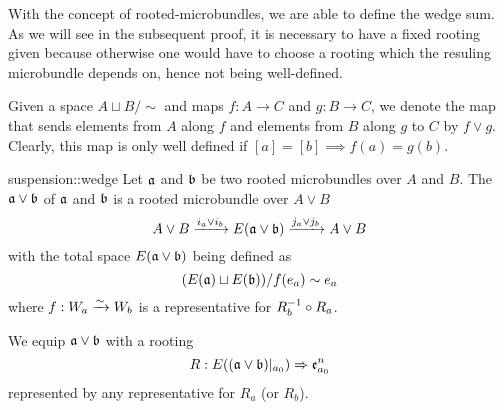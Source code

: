 \begin{myparagraph}
    With the concept of rooted-microbundles,
    we are able to define the wedge sum.
    As we will see in the subsequent proof,
    it is necessary to have a fixed rooting given because otherwise
    one would have to choose a rooting which the resuling microbundle depends on,
    hence not being well-defined.

    Given a space $A \sqcup B / \sim$ and maps $f: A \to C$ and $g: B \to C$, we denote
    the map that sends elements from $A$ along $f$
    and elements from $B$ along $g$ to $C$ by $f \vee g$.
    Clearly, this map is only well defined if $[a] = [b] \implies f(a) = g(b)$.
\end{myparagraph}

\begin{mydefinition}{suspension::wedge}{}
    Let $\mathfrak{a}$ and $\mathfrak{b}$ be two rooted microbundles over $A$ and $B$.
    The  $\mathfrak{a} \vee \mathfrak{b}$ of $\mathfrak{a}$ and $\mathfrak{b}$ is a rooted microbundle over $A \vee B$
    \[ A \vee B \xrightarrow{i_a \vee i_b} E(\mathfrak{a} \vee \mathfrak{b}) \xrightarrow{j_a \vee j_b} A \vee B \]
    with the total space $E(\mathfrak{a} \vee \mathfrak{b})$ being defined as
    \[ (E(\mathfrak{a}) \sqcup E(\mathfrak{b})) / f(e_a) \sim e_a \]
    where $f: W_a \xrightarrow{\sim} W_b$ is a representative for $R_b^{-1} \circ R_a$.
    
    We equip $\mathfrak{a} \vee \mathfrak{b}$ with a rooting
    \[ R: E((\mathfrak{a} \vee \mathfrak{b})\vert_{a_0}) \Rightarrow{} \mathfrak{e}^{n}_{a_0} \]
    represented by any representative for $R_a$ (or $R_b$).
\end{mydefinition}

